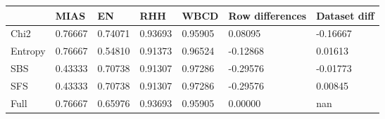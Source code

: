 \begin{tabular}{|l|l|l|l|l|l|l|}
\toprule
{} &    MIAS &      EN &     RHH &    WBCD & Row differences & Dataset diff \\
\midrule
Chi2    & 0.76667 & 0.74071 & 0.93693 & 0.95905 &         0.08095 &     -0.16667 \\
Entropy & 0.76667 & 0.54810 & 0.91373 & 0.96524 &        -0.12868 &      0.01613 \\
SBS     & 0.43333 & 0.70738 & 0.91307 & 0.97286 &        -0.29576 &     -0.01773 \\
SFS     & 0.43333 & 0.70738 & 0.91307 & 0.97286 &        -0.29576 &      0.00845 \\
Full    & 0.76667 & 0.65976 & 0.93693 & 0.95905 &         0.00000 &          nan \\
\bottomrule
\end{tabular}
